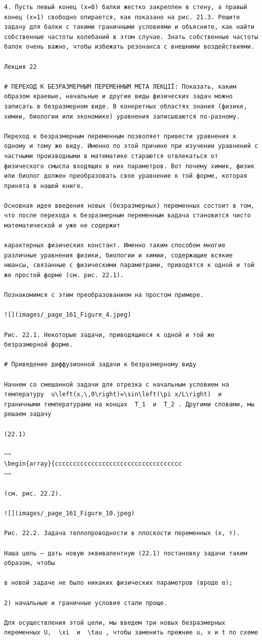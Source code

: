 \documentclass[
  ukrainian,
]{article}
\begin{document}
\begin{verbatim}
4. Пусть левый конец (x=0) балки жестко закреплен в стену, а правый конец (x=1) свободно опирается, как показано на рис. 21.3. Решите задачу для балки с такими граничными условиями и объясните, как найти собственные частоты колебаний в этом случае. Знать собственные частоты балок очень важно, чтобы избежать резонанса с внешними воздействиями.

Лекция 22

# ПЕРЕХОД К БЕЗРАЗМЕРНЫМ ПЕРЕМЕННЫМ МЕТА ЛЕКЦІЇ: Показать, каким образом краевые, начальные и другие виды физических задач можно записать в безразмерном виде. В конкретных областях знания (физике, химии, биологии или экономике) уравнения записываются по-разному.

Переход к безразмерным переменным позволяет привести уравнения к одному и тому же виду. Именно по этой причине при изучении уравнений с частными производными в математике стараются отвлекаться от физического смысла входящих в них параметров. Вот почему химик, физик или биолог должен преобразовать свое уравнение к той форме, которая принята в нашей книге.

Основная идея введения новых (безразмерных) переменных состоит в том, что после перехода к безразмерным переменным вадача становится чисто математической и уже не содержит

карактерных физических констант. Именно таким способом многие различные уравнения физики, биологии и химии, содержащие всякие нюансы, связанные с физическими параметрами, приводятся к одной и той же простой форме (см. рис. 22.1).

Познакомимся с этим преобразованием на простом примере.

![](images/_page_161_Figure_4.jpeg)

Рис. 22.1. Некоторые задачи, приводящиеся к одной и той же безразмерной форме.

# Приведение диффузионной задачи к безразмерному виду

Начнем со смешанной задачи для отрезка с начальным условием на температуру  u\left(x,\,0\right)=\sin\left(\pi x/L\right)  и граничными температурами на концах  T_1  и  T_2 . Другими словами, мы решаем задачу

(22.1) 

~~
\begin{array}{ccccccccccccccccccccccccccccccccccc
~~

(см. рис. 22.2).

![](images/_page_161_Figure_10.jpeg)

Рис. 22.2. Задача теплопроводности в плоскости переменных (х, т).

Наша цель — дать новую эквивалентную (22.1) постановку задачи таким образом, чтобы

в новой задаче не было никаких физических параметров (вроде α);

2) начальные и граничные условия стали проще.

Для осуществления этой цели, мы введем три новых безразмерных переменных U,  \xi  и  \tau , чтобы заменить прежние u, x и t по схеме
\end{verbatim}
\end{document}

